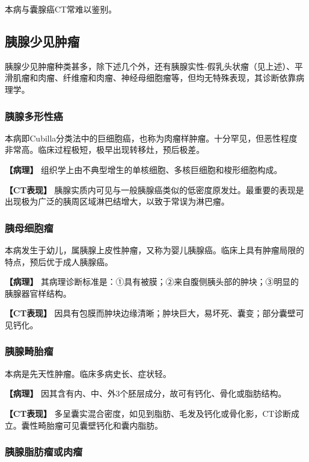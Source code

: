 本病与囊腺癌CT常难以鉴别。

\subsection{胰腺少见肿瘤}

胰腺少见肿瘤种类甚多，除下述几个外，还有胰腺实性-假乳头状瘤（见上述）、平滑肌瘤和肉瘤、纤维瘤和肉瘤、神经母细胞瘤等，但均无特殊表现，其诊断依靠病理学。

\subsubsection{胰腺多形性癌}

本病即Cubilla分类法中的巨细胞癌，也称为肉瘤样肿瘤。十分罕见，但恶性程度非常高。临床过程极短，极早出现转移灶，预后极差。

\textbf{【病理】}
组织学上由不典型增生的单核细胞、多核巨细胞和梭形细胞构成。

\textbf{【CT表现】}
胰腺实质内可见与一般胰腺癌类似的低密度原发灶。最重要的表现是出现极为广泛的胰周区域淋巴结增大，以致于常误为淋巴瘤。

\subsubsection{胰母细胞瘤}

本病发生于幼儿，属胰腺上皮性肿瘤，又称为婴儿胰腺癌。临床上具有肿瘤局限的特点，预后优于成人胰腺癌。

\textbf{【病理】}
其病理诊断标准是：①具有被膜；②来自腹侧胰头部的肿块；③明显的胰腺器官样结构。

\textbf{【CT表现】}
因具有包膜而肿块边缘清晰；肿块巨大，易坏死、囊变；部分囊壁可见钙化。

\subsubsection{胰腺畸胎瘤}

本病是先天性肿瘤。临床多病史长、症状轻。

\textbf{【病理】}
因其含有内、中、外3个胚层成分，故可有钙化、骨化或脂肪结构。

\textbf{【CT表现】}
多呈囊实混合密度，如见到脂肪、毛发及钙化或骨化影，CT诊断成立。囊性畸胎瘤可见囊壁钙化和囊内脂肪。

\subsubsection{胰腺脂肪瘤或肉瘤}


